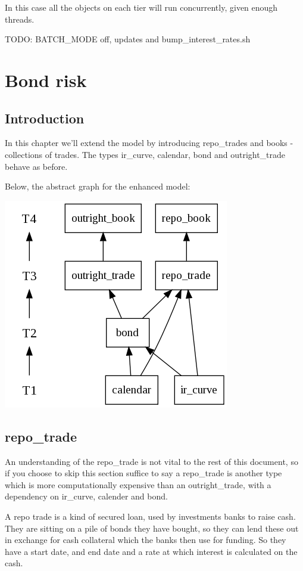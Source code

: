 \documentclass{report}
\begin{document}
In this case all the objects on each tier will run concurrently, given enough threads.

TODO: BATCH_MODE off, updates and bump_interest_rates.sh

\chapter{Bond risk}

\section{Introduction}

In this chapter we'll extend the model by introducing repo_trades and books - collections of trades. The types ir_curve, calendar, bond and outright_trade behave as before.

Below, the abstract graph for the enhanced model:

\includegraphics[scale=0.5]{bondriskabstract.png} 

\section{repo_trade}

An understanding of the repo_trade is not vital to the rest of this document, so if you choose to skip this section suffice to say a repo_trade is another type which is more computationally expensive than an outright_trade, with a dependency on ir_curve, calender and bond. 

A repo trade is a kind of secured loan, used by investments banks to raise cash. They are sitting on a pile of bonds they have bought, so they can lend these out in exchange for cash collateral which the banks then use for funding. So they have a start date, and end date and a rate at which interest is calculated on the cash.
\end{document}
